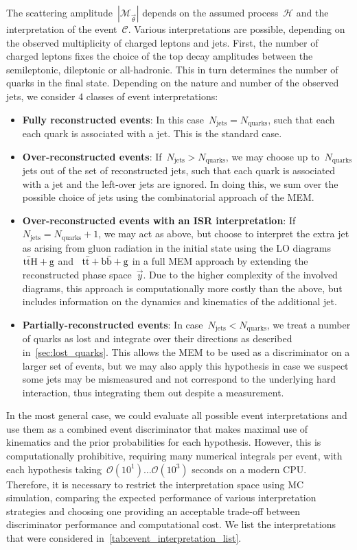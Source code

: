 The scattering amplitude~$|\mathcal{M}_{\vec{\theta}}|$ depends on the assumed process~$\mathcal{H}$ and the interpretation of the event~$\mathcal{C}$. Various interpretations are possible, depending on the observed multiplicity of charged leptons and jets. First, the number of charged leptons fixes the choice of the top decay amplitudes between the semileptonic, dileptonic or all-hadronic. This in turn determines the number of quarks in the final state. Depending on the nature and number of the observed jets, we consider 4 classes of event interpretations:

\begin{itemize}
\item \textbf{Fully reconstructed events}: In this case~$N_{\mathrm{jets}} = N_{\mathrm{quarks}}$, such that each each quark is associated with a jet. This is the standard case.
\item \textbf{Over-reconstructed events}: If~$N_{\mathrm{jets}} > N_{\mathrm{quarks}}$, we may choose up to~$N_{\mathrm{quarks}}$ jets out of the set of reconstructed jets, such that each quark is associated with a jet and the left-over jets are ignored. In doing this, we sum over the possible choice of jets using the combinatorial approach of the MEM.
\item \textbf{Over-reconstructed events with an ISR interpretation}: If~$N_{\mathrm{jets}} = N_{\mathrm{quarks}} + 1$, we may act as above, but choose to interpret the extra jet as arising from gluon radiation in the initial state using the LO diagrams~$\mathrm{t} \bar{\mathrm{t}} \mathrm{H} + \mathrm{g}$ and ~$\mathrm{t} \bar{\mathrm{t}} + \mathrm{b}\bar{\mathrm{b}} + \mathrm{g}$ in a full MEM approach by extending the reconstructed phase space~$\vec{y}$. Due to the higher complexity of the involved diagrams, this approach is computationally more costly than the above, but includes information on the dynamics and kinematics of the additional jet.
\item \textbf{Partially-reconstructed events}: In case~$N_{\mathrm{jets}} < N_{\mathrm{quarks}}$, we treat a number of quarks as lost and integrate over their directions as described in~\cref{sec:lost_quarks}. This allows the MEM to be used as a discriminator on a larger set of events, but we may also apply this hypothesis in case we suspect some jets may be mismeasured and not correspond to the underlying hard interaction, thus integrating them out despite a measurement.
\end{itemize}

In the most general case, we could evaluate all possible event interpretations and use them as a combined event discriminator that makes maximal use of kinematics and the prior probabilities for each hypothesis. However, this is computationally prohibitive, requiring many numerical integrals per event, with each hypothesis taking~$\mathcal{O}(10^1)\dots \mathcal{O}(10^3)$ seconds on a modern CPU. Therefore, it is necessary to restrict the interpretation space using MC simulation, comparing the expected performance of various interpretation strategies and choosing one providing an acceptable trade-off between discriminator performance and computational cost. We list the interpretations that were considered in~\cref{tab:event_interpretation_list}.

